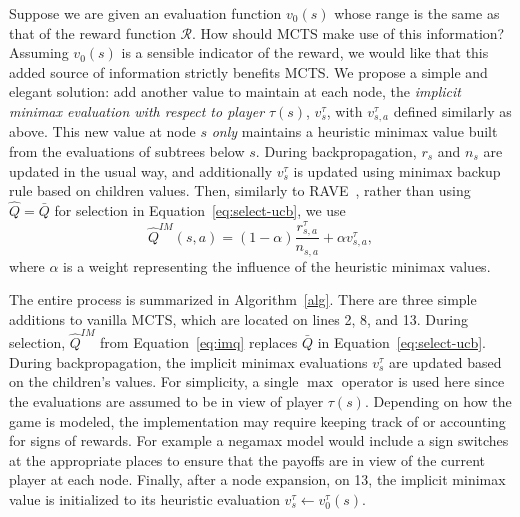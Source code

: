\documentclass[conference]{IEEEtran}
\newcommand{\bQ}{\bar{Q}}
\newcommand{\cR}{\mathcal{R}}
\newcommand{\hQ}{\hat{Q}}
\begin{document}
Suppose we are given an evaluation function $v_0(s)$ whose range is the same as that of the reward function $\cR$. 
How should MCTS make use of this information? 
Assuming $v_0(s)$ is a sensible indicator of the reward, we would like that this added source of information
strictly benefits MCTS. 
We propose a simple and elegant solution: add another value to maintain at each node, the 
{\it implicit minimax evaluation with respect to player} $\tau(s)$, $v^{\tau}_s$, with $v^{\tau}_{s,a}$ defined similarly 
as above. 
This new value at node $s$ {\it only} maintains a heuristic minimax value built from the evaluations of subtrees below $s$. 
During backpropagation, $r_s$ and $n_s$ are updated in the usual way, and additionally $v^{\tau}_s$ is updated using minimax backup 
rule based on children values. Then, similarly to RAVE~\cite{Gelly07Combining}, rather than using $\hQ = \bQ$ for 
selection in Equation~\ref{eq:select-ucb}, we use
\begin{equation}
\label{eq:imq}
\hQ^{\mathit{IM}}(s,a) = (1-\alpha) \frac{r^{\tau}_{s,a}}{n_{s,a}} + \alpha v^{\tau}_{s,a}, 
\end{equation}
where $\alpha$ is a weight representing the influence of the heuristic minimax values.

The entire process is summarized in Algorithm~\ref{alg}. There are three simple additions to vanilla MCTS,
which are located on lines 2, 8, and 13.
During selection, $\hQ^{\mathit{IM}}$ from Equation~\ref{eq:imq} replaces $\bQ$ in 
Equation~\ref{eq:select-ucb}. During backpropagation, the implicit minimax evaluations $v^{\tau}_s$ are updated based on 
the children's values. For simplicity, a single $\max$ operator is used here since the evaluations are assumed to be in 
view of player $\tau(s)$. Depending on how the game is modeled, the implementation may require keeping track of or  
accounting for signs of rewards. For example a negamax model would include a sign switches at the appropriate places 
to ensure that the payoffs are in view of the current player at each node.  
Finally, after a node expansion, on 13, the implicit minimax value is initialized to its heuristic
evaluation $v^{\tau}_s \leftarrow v^{\tau}_0(s)$. 
\end{document}
